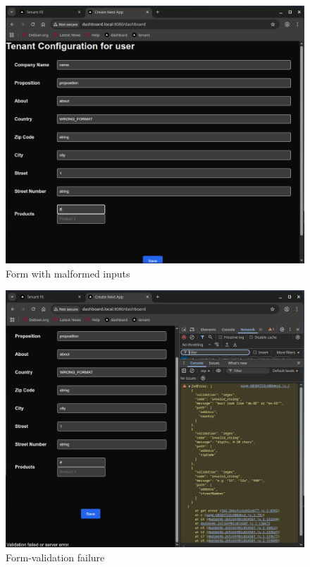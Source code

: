 \documentclass[11pt, a4paper, oneside, listof=totoc]{scrartcl}
\begin{document}
                \begin{figure}[h!]
                    \centering
                    \includegraphics[width=\textwidth]{screenshots/eval/dashboardfe/dashboardfe-form-with-malformed-inputs.png}
                    \caption{Form with malformed inputs}\label{fig:dashboardfe-form-with-malformed-inputs}
                \end{figure}

                \begin{figure}[h!]
                    \centering
                    \includegraphics[width=\textwidth]{screenshots/eval/dashboardfe/dashboardfe-validation-failure.png}
                    \caption{Form-validation failure}\label{fig:dashboardfe-form-validation-failure}
                \end{figure}
\end{document}

